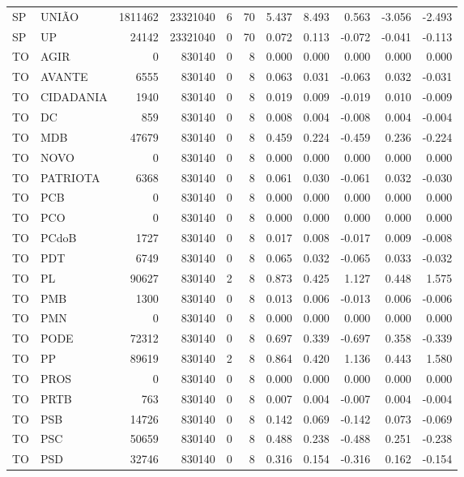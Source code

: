 \begin{landscape}
\begin{longtable}{llrrrrrrrrr}
SP & UNIÃO & 1811462 & 23321040 & 6 & 70 & 5.437 & 8.493 & 0.563 & -3.056 & -2.493 \\
SP & UP & 24142 & 23321040 & 0 & 70 & 0.072 & 0.113 & -0.072 & -0.041 & -0.113 \\
TO & AGIR & 0 & 830140 & 0 & 8 & 0.000 & 0.000 & 0.000 & 0.000 & 0.000 \\
TO & AVANTE & 6555 & 830140 & 0 & 8 & 0.063 & 0.031 & -0.063 & 0.032 & -0.031 \\
TO & CIDADANIA & 1940 & 830140 & 0 & 8 & 0.019 & 0.009 & -0.019 & 0.010 & -0.009 \\
TO & DC & 859 & 830140 & 0 & 8 & 0.008 & 0.004 & -0.008 & 0.004 & -0.004 \\
TO & MDB & 47679 & 830140 & 0 & 8 & 0.459 & 0.224 & -0.459 & 0.236 & -0.224 \\
TO & NOVO & 0 & 830140 & 0 & 8 & 0.000 & 0.000 & 0.000 & 0.000 & 0.000 \\
TO & PATRIOTA & 6368 & 830140 & 0 & 8 & 0.061 & 0.030 & -0.061 & 0.032 & -0.030 \\
TO & PCB & 0 & 830140 & 0 & 8 & 0.000 & 0.000 & 0.000 & 0.000 & 0.000 \\
TO & PCO & 0 & 830140 & 0 & 8 & 0.000 & 0.000 & 0.000 & 0.000 & 0.000 \\
TO & PCdoB & 1727 & 830140 & 0 & 8 & 0.017 & 0.008 & -0.017 & 0.009 & -0.008 \\
TO & PDT & 6749 & 830140 & 0 & 8 & 0.065 & 0.032 & -0.065 & 0.033 & -0.032 \\
TO & PL & 90627 & 830140 & 2 & 8 & 0.873 & 0.425 & 1.127 & 0.448 & 1.575 \\
TO & PMB & 1300 & 830140 & 0 & 8 & 0.013 & 0.006 & -0.013 & 0.006 & -0.006 \\
TO & PMN & 0 & 830140 & 0 & 8 & 0.000 & 0.000 & 0.000 & 0.000 & 0.000 \\
TO & PODE & 72312 & 830140 & 0 & 8 & 0.697 & 0.339 & -0.697 & 0.358 & -0.339 \\
TO & PP & 89619 & 830140 & 2 & 8 & 0.864 & 0.420 & 1.136 & 0.443 & 1.580 \\
TO & PROS & 0 & 830140 & 0 & 8 & 0.000 & 0.000 & 0.000 & 0.000 & 0.000 \\
TO & PRTB & 763 & 830140 & 0 & 8 & 0.007 & 0.004 & -0.007 & 0.004 & -0.004 \\
TO & PSB & 14726 & 830140 & 0 & 8 & 0.142 & 0.069 & -0.142 & 0.073 & -0.069 \\
TO & PSC & 50659 & 830140 & 0 & 8 & 0.488 & 0.238 & -0.488 & 0.251 & -0.238 \\
TO & PSD & 32746 & 830140 & 0 & 8 & 0.316 & 0.154 & -0.316 & 0.162 & -0.154 \\

\end{longtable}
\end{landscape}
